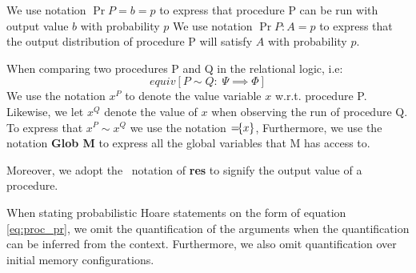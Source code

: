 We use notation $\Pr{P = b} = p$ to express that procedure P can be run with
output value $b$ with probability $p$
We use notation $\Pr{P : A} = p$ to express that the output distribution of
procedure P will satisfy $A$ with probability $p$.


When comparing two procedures P and Q in the relational logic, i.e:
\[
  equiv[P \sim Q :\; \Psi \implies \Phi]
\]
We use the notation $x^{P}$ to denote the value variable $x$ w.r.t. procedure P.
Likewise, we let $x^{Q}$ denote the value of $x$ when observing the run of
procedure Q. To express that $x^{P} \sim x^{Q}$ we use the notation ${=}\!\{x\}$,
Furthermore, we use the notation \textbf{Glob M} to express all the global
variables that M has access to.


Moreover, we adopt the \easycrypt\ notation of \textbf{res} to signify the
output value of a procedure.


When stating probabilistic Hoare statements on the form of equation
\ref{eq:proc_pr}, we omit the quantification of the arguments when the
quantification can be inferred from the context. Furthermore, we also omit
quantification over initial memory configurations.

